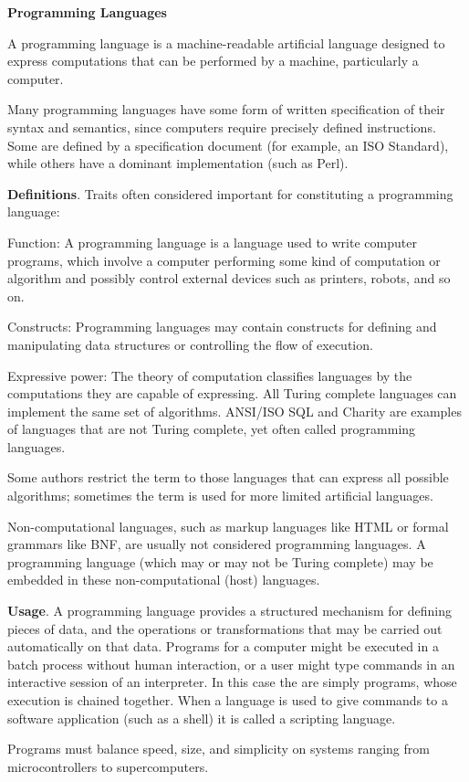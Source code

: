 \documentclass[a4paper, 12pt]{extarticle}
\begin{document}
\begin{center}
  \textbf{Programming Languages}
\end{center}

A programming language is a machine-readable artificial language designed to
express computations that can be performed by a machine, particularly a
computer.

Many programming languages have some form of written specification of their
syntax and semantics, since computers require precisely defined instructions.
Some are defined by a specification document (for example, an ISO Standard),
while others have a dominant implementation (such as Perl).

\textbf{Definitions}. Traits often considered important for constituting a
programming language:

Function: A programming language is a language used to write computer programs,
which involve a computer performing some kind of computation or algorithm and
possibly control external devices such as printers, robots, and so on.

Constructs: Programming languages may contain constructs for defining and
manipulating data structures or controlling the flow of execution.

Expressive power: The theory of computation classifies languages by the
computations they are capable of expressing. All Turing complete languages can
implement the same set of algorithms. ANSI/ISO SQL and Charity are examples of
languages that are not Turing complete, yet often called programming languages.

Some authors restrict the term  to those languages
that can express all possible algorithms; sometimes the term  is used for more limited artificial languages.

Non-computational languages, such as markup languages like HTML or formal
grammars like BNF, are usually not considered programming languages. A
programming language (which may or may not be Turing complete) may be embedded
in these non-computational (host) languages.

\textbf{Usage}. A programming language provides a structured mechanism for
defining pieces of data, and the operations or transformations that may be
carried out automatically on that data. Programs for a computer might be
executed in a batch process without human interaction, or a user might type
commands in an interactive session of an interpreter. In this case the
 are simply programs, whose execution is chained together. When a
language is used to give commands to a software application (such as a shell) it
is called a scripting language.

Programs must balance speed, size, and simplicity on systems ranging from
microcontrollers to supercomputers.
\end{document}
